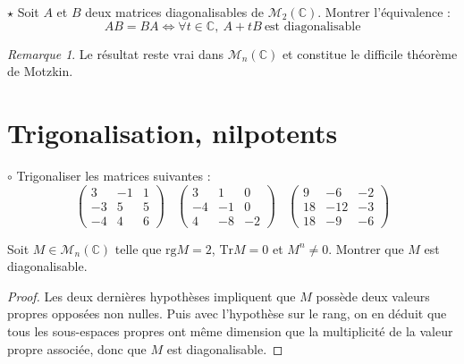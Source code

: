 \documentclass[french,a4paper]{article}
\newcommand{\C}{\mathbb{C}}
\newcommand{\Tr}{\text{Tr}}
\theoremstyle{plain}
\theoremstyle{definition}
\theoremstyle{remark}
\newtheorem*{rmq}{Remarque}
\begin{document}
\begin{ex}[Châteaux]{$\star$}
	Soit $A$ et $B$ deux matrices diagonalisables de $\mathcal{M}_2(\C)$. Montrer l'équivalence : $$AB=BA\iff \forall t\in\C,\ A+tB\ \text{est diagonalisable}$$
\end{ex}
\begin{rmq}
	Le résultat reste vrai dans $\mathcal{M}_n(\C)$ et constitue le difficile théorème de Motzkin.
\end{rmq}

\section{Trigonalisation, nilpotents}

\begin{ex}{$\circ$}
	Trigonaliser les matrices suivantes :
	$$\begin{pmatrix}
		3&-1&1\\
		-3&5&5\\
		-4&4&6
	\end{pmatrix}\ \ \ \
	\begin{pmatrix}
		3&1&0\\
		-4&-1&0\\
		4&-8&-2
	\end{pmatrix}\ \ \ \
	\begin{pmatrix}
		9&-6&-2\\
		18&-12&-3\\
		18&-9&-6
	\end{pmatrix}$$
\end{ex}

\begin{ex}{}
	Soit $M\in\mathcal{M}_n(\C)$ telle que $\text{rg}M=2$, $\Tr M=0$ et $M^n\ne 0$. Montrer que $M$ est diagonalisable.
\end{ex}
\begin{proof}
	Les deux dernières hypothèses impliquent que $M$ possède deux valeurs propres opposées non nulles. Puis avec l'hypothèse sur le rang, on en déduit que tous les sous-espaces propres ont même dimension que la multiplicité de la valeur propre associée, donc que $M$ est diagonalisable.
\end{proof}
\end{document}
